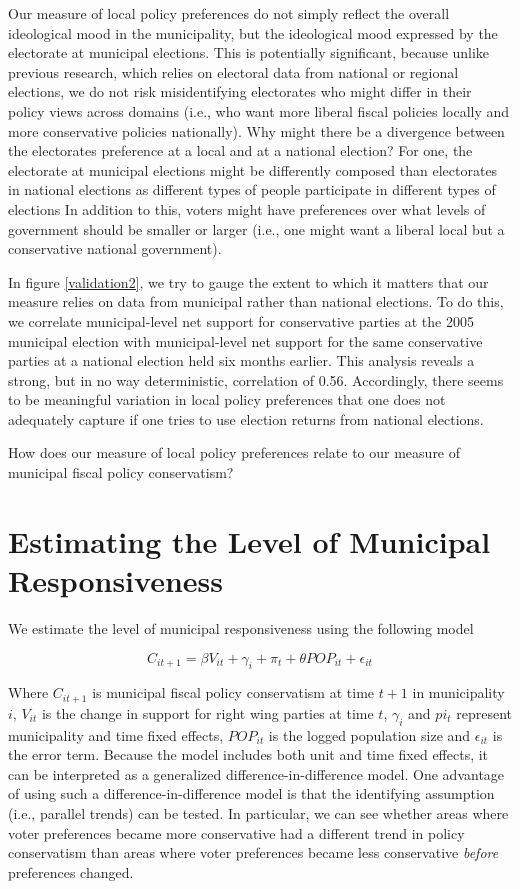 \documentclass[a4paper,12pt]{article}
\begin{document}
Our measure of local policy preferences do not simply reflect the overall ideological mood in the municipality, but the ideological mood expressed by the electorate at municipal elections. This is potentially significant, because unlike previous research, which relies on electoral data from national or regional elections, we do not risk misidentifying electorates who might differ in their policy views across domains (i.e., who want more liberal fiscal policies locally and more conservative policies nationally). Why might there be a divergence between the electorates preference at a local and at a national election? For one, the electorate at municipal elections might be differently composed than electorates in national elections as different types of people participate in different types of elections \citep{ansolabehere2015beyond,hansen2017social} In addition to this, voters might have preferences over what levels of government should be smaller or larger (i.e., one might want a liberal local but a conservative national government).

In figure \ref{validation2}, we try to gauge the extent to which it matters that our measure relies on data from municipal rather than national elections. To do this, we correlate  municipal-level net support for conservative parties at the 2005 municipal election with municipal-level net support for the same conservative parties at a national election held six months earlier. This analysis reveals a strong, but in no way deterministic, correlation of 0.56. Accordingly, there seems to be meaningful variation in local policy preferences that one does not adequately capture if one tries to use election returns from national elections.

How does our measure of local policy preferences relate to our measure of municipal fiscal policy conservatism? 

\section{Estimating the Level of Municipal Responsiveness}

We estimate the level of municipal responsiveness using the following model

\begin{equation}
 C_{it+1} =  \beta  V_{it} + \gamma_i +  \pi_t + \theta POP_{it}  + \epsilon_{it}
\end{equation}

Where $C_{it+1}$ is municipal fiscal policy conservatism at time $t+1$ in municipality $i$, $V_{it}$ is the change in support for right wing parties at time $t$, $\gamma_i$ and $pi_t$ represent municipality and time fixed effects, $POP_{it}$ is the logged population size and $\epsilon_{it}$ is the error term. Because the model includes both unit and time fixed effects, it can be interpreted as a generalized difference-in-difference model. One advantage of using such a difference-in-difference model is that the identifying assumption (i.e., parallel trends) can be tested. In particular, we can see whether areas where voter preferences became more conservative had a different trend in policy conservatism than areas where voter preferences became less conservative \textit{before} preferences changed.  
\end{document}

